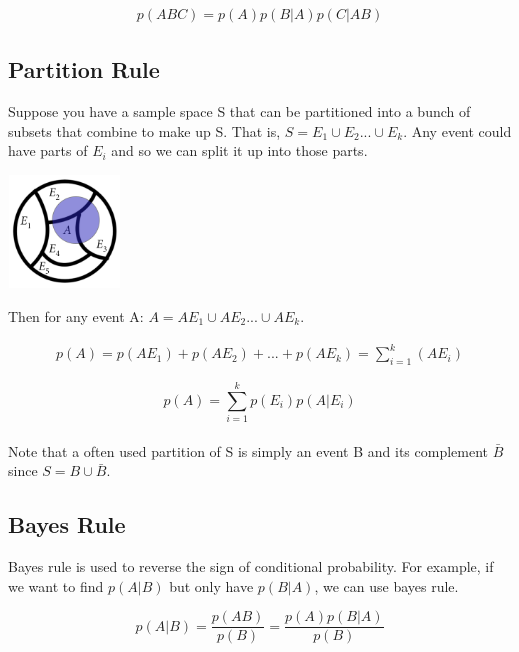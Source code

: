 \documentclass[12pt, letterpaper]{article}
\begin{document}
\begin{gather*}
p\left(ABC\right) = p\left(A\right)p\left(B|A\right)p\left(C|AB\right)
\end{gather*}

\subsection{Partition Rule}
Suppose you have a sample space S that can be partitioned into a bunch of subsets that combine to make up S. That is, \(S = E_1 \cup E_2 ... \cup E_k\). Any event could have parts of \(E_i\) and so we can split it up into those parts.\\

\begin{center}
\includegraphics[width=3cm, height=3cm]{partition_rule}
\end{center}

Then for any event A: \(A = AE_1 \cup AE_2 ... \cup AE_k\). 

\begin{gather*}
p\left(A\right) = p\left(AE_1\right) + p\left(AE_2\right) + ... + p\left(AE_k\right) = \sum_{i = 1}^{k} \left(AE_i\right)
\end{gather*}

\begin{equation}
p\left(A\right) = \sum_{i = 1}^{k} p\left(E_i\right)p\left(A|E_i\right)
\end{equation}\\

Note that a often used partition of S is simply an event B and its complement \(\bar{B}\) since \(S = B \cup \bar{B}\).

\subsection{Bayes Rule}
Bayes rule is used to reverse the sign of conditional probability. For example, if we want to find \(p\left(A|B\right)\) but only have \(p\left(B|A\right)\), we can use bayes rule.

\begin{equation}
p(A|B) = \frac{p\left(AB\right)}{p\left(B\right)} = \frac{p\left(A\right)p\left(B|A\right)}{p\left(B\right)}
\end{equation}\\
\end{document}

